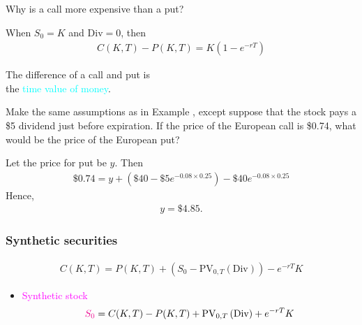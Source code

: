 \begin{frame}[fragile,t]
	\begin{center}
		Why is a call more expensive than a put?

		\pause
		\bigskip
		\mySeparateLine
		\bigskip

		When $S_0=K$ and $\text{Div}=0$, then
		\begin{align*}
			C(K,T)-P(K,T) = K \left(1-e^{-rT}\right)
		\end{align*}
		\bigskip

		\pause
		The difference of a call and put is\\
		the \textcolor{cyan}{time value of money}.
	\end{center}
\end{frame}
\begin{frame}[fragile,t]
	\begin{myexample}
Make the same assumptions as in Example , except suppose that the
stock pays a \$5 dividend just before expiration. If the price of the European call is \$0.74, what
would be the price of the European put?
	\end{myexample}
	\bigskip
	\pause
	\begin{mysol}
		Let the price for put be $y$. Then
		\begin{align*}
			\$0.74 = y + \left(\$40 - \$5 e^{-0.08 \times 0.25}\right) - \$40e^{−0.08\times0.25}
		\end{align*}
		Hence,
		\begin{align*}
			y = \$4.85.
		\end{align*}
		\myEnd
	\end{mysol}
\end{frame}
\begin{frame}[fragile,t]
	\frametitle{Synthetic securities}
	\begin{align*}
		C(K,T) = P(K,T) + \left(S_0-\text{PV}_{0,T}(\text{Div})\right) - e^{-rT} K
	\end{align*}
	\mySeparateLine

	\begin{itemize}
		\item \textcolor{magenta}{Synthetic stock}
			\begin{align*}
				\textcolor{magenta}{S_0} = C(K,T) - P(K,T) + \text{PV}_{0,T}\left(\text{Div}\right) + e^{-rT} K
			\end{align*}
	\end{itemize}
\end{frame}

